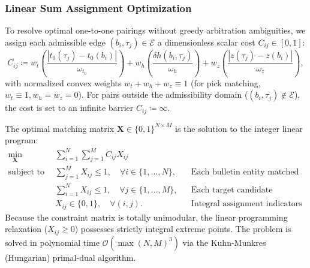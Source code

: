 \subsubsection*{Linear Sum Assignment Optimization}
To resolve optimal one-to-one pairings without greedy arbitration ambiguities,
we assign each admissible edge $(b_i, \tau_j) \in \mathcal{E}$ a dimensionless
scalar cost $C_{ij} \in [0, 1]$:
\begin{equation}
  C_{ij} \coloneqq w_t \left(\frac{|t_0(\tau_j) -
  t_0(b_i)|}{\omega_{t_0}}\right)
  + w_h \left(\frac{\delta h(b_i, \tau_j)}{\omega_h}\right)
  + w_z \left(\frac{|z(\tau_j) - z(b_i)|}{\omega_z}\right),
  \label{eq:supp_assignment_cost}
\end{equation}
with normalized convex weights $w_t + w_h + w_z \equiv 1$ (for pick matching,
$w_t \equiv 1, w_h = w_z = 0$). For pairs outside the admissibility domain
($(b_i, \tau_j) \notin \mathcal{E}$), the cost is set to an infinite barrier
$C_{ij} \coloneqq \infty$.

The optimal matching matrix $\mathbf{X} \in \{0, 1\}^{N \times M}$
is the solution
to the integer linear program:
\begin{align}
  \min_{\mathbf{X}} \quad & \sum_{i=1}^N \sum_{j=1}^M C_{ij} X_{ij}
  \label{eq:supp_ilp_obj} \\
  \text{subject to} \quad & \sum_{j=1}^M X_{ij} \le 1, \quad \forall
  i \in \{1, \dots, N\},
  && \text{Each bulletin entity matched at most once}
  \label{eq:supp_ilp_row} \\
  & \sum_{i=1}^N X_{ij} \le 1, \quad \forall j \in \{1, \dots, M\},
  && \text{Each target candidate matched at most once}
  \label{eq:supp_ilp_col} \\
  & X_{ij} \in \{0, 1\}, \quad \forall (i, j).
  && \text{Integral assignment indicators} \label{eq:supp_ilp_integral}
\end{align}
Because the constraint matrix is totally unimodular, the linear
programming relaxation
($X_{ij} \ge 0$) possesses strictly integral extreme points. The
problem is solved
in polynomial time $\mathcal{O}(\max(N, M)^3)$ via the Kuhn-Munkres (Hungarian)
primal-dual algorithm.

